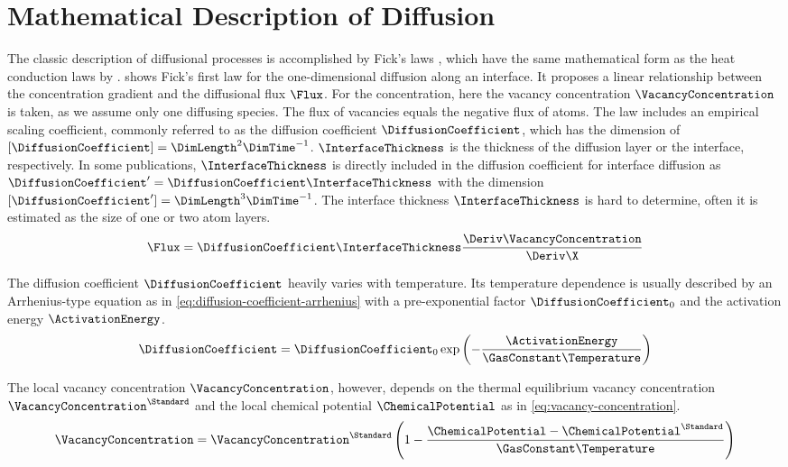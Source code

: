 \section{Mathematical Description of Diffusion}\label{sec:diffusion}

The classic description of diffusional processes is accomplished by Fick's laws \cite{Fick1855}, which have the same mathematical form as the heat conduction laws by \textcite{Fourier1888}.
 shows Fick's first law for the one-dimensional diffusion along an interface.
It proposes a linear relationship between the concentration gradient and the diffusional flux $\Flux$.
For the concentration, here the vacancy concentration $\VacancyConcentration$ is taken, as we assume only one diffusing species.
The flux of vacancies equals the negative flux of atoms.
The law includes an empirical scaling coefficient, commonly referred to as the diffusion coefficient $\DiffusionCoefficient$, which has the dimension of $[\DiffusionCoefficient] = \DimLength^2\DimTime^{-1}$.
$\InterfaceThickness$ is the thickness of the diffusion layer or the interface, respectively.
In some publications, $\InterfaceThickness$ is directly included in the diffusion coefficient for interface diffusion as $\DiffusionCoefficient' = \DiffusionCoefficient\InterfaceThickness$ with the dimension $[\DiffusionCoefficient'] = \DimLength^3\DimTime^{-1}$.
The interface thickness $\InterfaceThickness$ is hard to determine, often it is estimated as the size of one or two atom layers.
\begin{equation}
    \Flux = \DiffusionCoefficient\InterfaceThickness \frac{\Deriv\VacancyConcentration}{\Deriv\X}
    \label{eq:fick-first}
\end{equation}

The diffusion coefficient $\DiffusionCoefficient$ heavily varies with temperature.
Its temperature dependence is usually described by an Arrhenius-type equation as in \cref{eq:diffusion-coefficient-arrhenius} with a pre-exponential factor $\DiffusionCoefficient_0$ and the activation energy $\ActivationEnergy$.
\begin{equation}
    \DiffusionCoefficient = \DiffusionCoefficient_0 \exp \left( -\frac{\ActivationEnergy}{\GasConstant\Temperature} \right)
    \label{eq:diffusion-coefficient-arrhenius}
\end{equation}

The local vacancy concentration $\VacancyConcentration$, however, depends on the thermal equilibrium vacancy concentration $\VacancyConcentration^\Standard$ and the local chemical potential $\ChemicalPotential$ as in \cref{eq:vacancy-concentration}.
\begin{equation}
    \VacancyConcentration = \VacancyConcentration^\Standard \left( 1 - \frac{\ChemicalPotential - \ChemicalPotential^\Standard}{\GasConstant\Temperature} \right)
    \label{eq:vacancy-concentration}
\end{equation}

